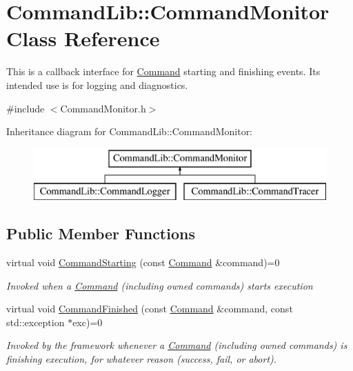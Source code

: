 \hypertarget{class_command_lib_1_1_command_monitor}{}\section{Command\+Lib\+:\+:Command\+Monitor Class Reference}
\label{class_command_lib_1_1_command_monitor}


This is a callback interface for \mbox{\hyperlink{class_command_lib_1_1_command}{Command}} starting and finishing events. Its intended use is for logging and diagnostics.  




{\ttfamily \#include $<$Command\+Monitor.\+h$>$}

Inheritance diagram for Command\+Lib\+:\+:Command\+Monitor\+:\begin{figure}[H]
\begin{center}
\leavevmode
\includegraphics[height=2.000000cm]{class_command_lib_1_1_command_monitor}
\end{center}
\end{figure}
\subsection*{Public Member Functions}
\begin{DoxyCompactItemize}
\item 
virtual void \mbox{\hyperlink{class_command_lib_1_1_command_monitor_a3924a1e128ac5adbf9455b988b56385c}{Command\+Starting}} (const \mbox{\hyperlink{class_command_lib_1_1_command}{Command}} \&command)=0
\begin{DoxyCompactList}\small\item\em Invoked when a \mbox{\hyperlink{class_command_lib_1_1_command}{Command}} (including owned commands) starts execution \end{DoxyCompactList}\item 
virtual void \mbox{\hyperlink{class_command_lib_1_1_command_monitor_a9e140c071319976689d26b5996356cb4}{Command\+Finished}} (const \mbox{\hyperlink{class_command_lib_1_1_command}{Command}} \&command, const std\+::exception $\ast$exc)=0
\begin{DoxyCompactList}\small\item\em Invoked by the framework whenever a \mbox{\hyperlink{class_command_lib_1_1_command}{Command}} (including owned commands) is finishing execution, for whatever reason (success, fail, or abort). \end{DoxyCompactList}\end{DoxyCompactItemize}


